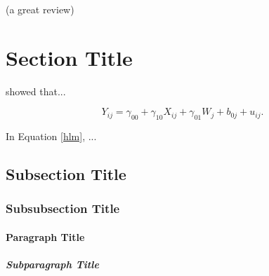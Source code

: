 (a great review)

\section{Section Title}
\textcite{hoffman_interpretation_2019} showed that...

\begin{equation}\label{hlm}
    Y_{ij} = \gamma_{00} + \gamma_{10}X_{ij} + \gamma_{01}W_j + b_{0j} + u_{ij}.
\end{equation}

In Equation \ref{hlm}, ...

\subsection{Subsection Title}

\subsubsection{Subsubsection Title}

\paragraph{Paragraph Title}

\subparagraph{Subparagraph Title}